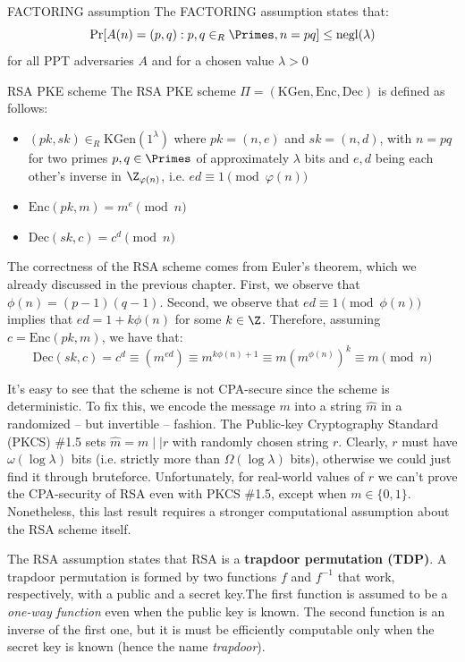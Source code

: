 \documentclass[a4paper, 12pt]{report}
\begin{document}
    \begin{framedass}{FACTORING assumption}
        The FACTORING assumption states that:
        \[\Pr[A(n) = (p,q) : p,q \in_R \Primes, n = pq] \leq \mathrm{negl}(\lambda)\]
        for all PPT adversaries $A$ and for a chosen value $\lambda > 0$
    \end{framedass}

    \begin{framedalgo}{RSA PKE scheme}
        The RSA PKE scheme $\Pi = (\mathrm{KGen}, \mathrm{Enc}, \mathrm{Dec})$ is defined as follows:
        \begin{itemize}
            \item $ (pk, sk) \in_R \mathrm{KGen}(1^{\lambda})$ where $pk = (n,e)$ and $sk = (n,d)$, with $n = pq$ for two primes $p,q \in \Primes$ of approximately $\lambda$ bits and $e,d$ being each other's inverse in $\Z_{\varphi(n)}$, i.e. $ed \equiv 1 \pmod{\varphi(n)}$
            \item $\mathrm{Enc}(pk, m) = m^e \pmod n$
            \item $\mathrm{Dec}(sk, c) = c^d \pmod n$ 
        \end{itemize}
    \end{framedalgo}

    The correctness of the RSA scheme comes from Euler's theorem, which we already discussed in the previous chapter. First, we observe that $\phi(n) = (p-1)(q-1)$. Second, we observe that $ed \equiv 1 \pmod{\phi(n)}$ implies that $ed = 1+k \phi(n)$ for some $k \in \Z$. Therefore, assuming $c = \mathrm{Enc}(pk, m)$, we have that:
    \[\mathrm{Dec}(sk, c) = c^d \equiv (m^{ed}) \equiv m^{k\phi(n)+1} \equiv m(m^{\phi(n)})^k \equiv m \pmod{n}\]

    It's easy to see that the scheme is not CPA-secure since the scheme is deterministic. To fix this, we encode the message $m$ into a string $\widehat m$ in a randomized -- but invertible -- fashion. The Public-key Cryptography Standard (PKCS) \#1.5 sets $\widehat m = m \mid\mid r$ with randomly chosen string $r$. Clearly, $r$ must have $\omega(\log \lambda)$ bits (i.e. strictly more than $\Omega(\log \lambda)$ bits), otherwise we could just find it through bruteforce. Unfortunately, for real-world values of $r$ we can't prove the CPA-security of RSA even with PKCS \#1.5, except when $m \in \{0,1\}$. Nonetheless, this last result requires a stronger computational assumption about the RSA scheme itself.
    
    The RSA assumption states that RSA is a \textbf{trapdoor permutation (TDP)}. A trapdoor permutation is formed by two functions $f$ and $f^{-1}$ that work, respectively, with a public and a secret key.The first function is assumed to be a \textit{one-way function} even when the public key is known. The second function is an inverse of the first one, but it is must be efficiently computable only when the secret key is known (hence the name \textit{trapdoor}).
\end{document}
